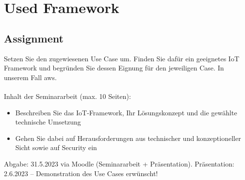 \chapter{Used Framework}

\section{Assignment}
Setzen Sie den zugewiesenen Use Case um.
Finden Sie dafür ein geeignetes IoT Framework und begründen Sie dessen Eignung für den jeweiligen Case. In unserem Fall \ac{aws}.\\
\\
Inhalt der Seminararbeit (max. 10 Seiten):
\begin{itemize}
    \item Beschreiben Sie das IoT-Framework, Ihr Lösungskonzept und die gewählte technische Umsetzung
    \item Gehen Sie dabei auf Herausforderungen aus technischer und konzeptioneller Sicht sowie auf Security ein
\end{itemize}
Abgabe: 31.5.2023 via Moodle (Seminararbeit + Präsentation). Präsentation: 2.6.2023 – Demonstration des Use Cases erwünscht!



